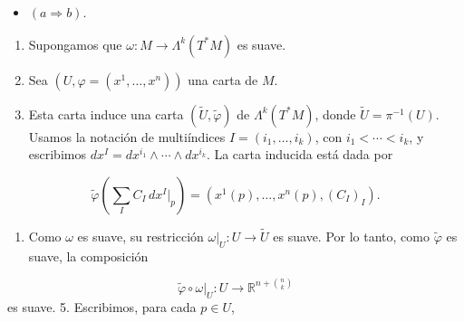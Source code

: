 \begin{bookproof}{}
\begin{itemize}
\item $(a\Rightarrow b)$.
\end{itemize}
\begin{enumerate}
\item Supongamos que $\omega:M\to\Lambda^k(T^*M)$ es suave.
\item Sea $(U,\varphi=(x^1,\ldots,x^n))$ una carta de $M$.
\item Esta carta induce una carta $(\widetilde U,\widetilde\varphi)$ de $\Lambda^k(T^*M)$, donde $\widetilde U=\pi^{-1}(U)$. Usamos la notación de multiíndices $I=(i_1,\ldots,i_k)$, con $i_1<\cdots<i_k$, y escribimos $dx^I=dx^{i_1}\wedge\cdots\wedge dx^{i_k}$. La carta inducida está dada por
\end{enumerate}
\[
\widetilde\varphi\left(\sum_I C_I\,dx^I|_p\right)=\left(x^1(p),\ldots,x^n(p),(C_I)_I\right).
\]
\begin{enumerate}[start=4]
\item Como $\omega$ es suave, su restricción $\omega|_U:U\to\widetilde U$ es suave. Por lo tanto, como $\widetilde\varphi$ es suave, la composición
\end{enumerate}
\[
\widetilde\varphi\circ\omega|_U:U\to\mathbb R^{n+\binom nk}
\]
es suave. 5. Escribimos, para cada $p\in U$,


\end{bookproof}

